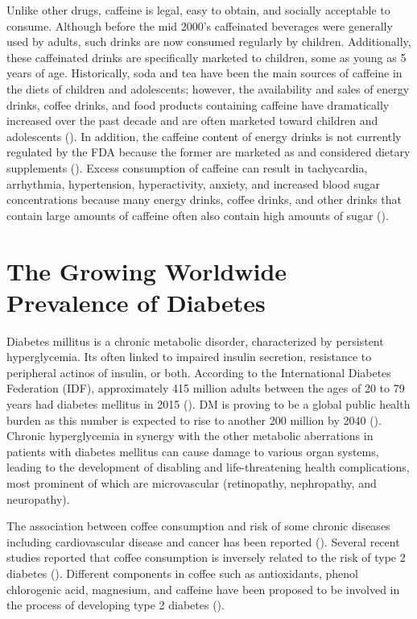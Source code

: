 \documentclass{scrartcl}
\begin{document}
Unlike other drugs, caffeine is legal, easy to obtain, and socially acceptable to consume. Although before the mid 2000's caffeinated beverages were generally used by adults, such drinks are now consumed regularly by children. Additionally, these caffeinated drinks are specifically marketed to children, some as young as 5 years of age. Historically, soda and tea have been the main sources of caffeine in the diets of children and adolescents; however, the availability and sales of energy drinks, coffee drinks, and food products containing caffeine have dramatically increased over the past decade and are often marketed toward children and adolescents (). In addition, the caffeine content of energy drinks is not currently regulated by the FDA because the former are marketed as and considered dietary supplements (). Excess consumption of caffeine can result in tachycardia, arrhythmia, hypertension, hyperactivity, anxiety, and increased blood sugar concentrations because many energy drinks, coffee drinks, and other drinks that contain large amounts of caffeine often also contain high amounts of sugar ().

\section*{The Growing Worldwide Prevalence of Diabetes}
\label{sec:orgee47729}
Diabetes millitus is a chronic metabolic disorder, characterized by persistent hyperglycemia. Its often linked to impaired insulin secretion, resistance to peripheral actinos of insulin, or both. According to the International Diabetes Federation (IDF), approximately 415 million adults between the ages of 20 to 79 years had diabetes mellitus in 2015 (). DM is proving to be a global public health burden as this number is expected to rise to another 200 million by 2040 (). Chronic hyperglycemia in synergy with the other metabolic aberrations in patients with diabetes mellitus can cause damage to various organ systems, leading to the development of disabling and life-threatening health complications, most prominent of which are microvascular (retinopathy, nephropathy, and neuropathy).

The association between coffee consumption and risk of some chronic diseases including cardiovascular disease and cancer has been reported (). Several recent studies reported that coffee consumption is inversely related to the risk of type 2 diabetes (). Different components in coffee such as antioxidants, phenol chlorogenic acid, magnesium, and caffeine have been proposed to be involved in the process of developing type 2 diabetes ().
\end{document}
